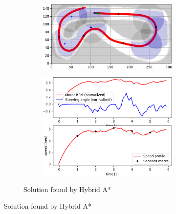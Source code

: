 \begin{figure}[!tbp]%
	\centering

	\begin{subfigure}[t]{\textwidth}
		\begin{subfigure}[c]{0.59\textwidth}
			\includegraphics[width=\textwidth]{../img/experiments/porto-hybrid_astar-trajectory}
		\end{subfigure}
		\hfill
		\begin{subfigure}[c]{0.4\textwidth}
			\includegraphics[width=\textwidth]{../img/experiments/porto-hybrid_astar-actuators}
		\end{subfigure}
		\caption{Solution found by Hybrid A*}
		\label{fig:solution_porto-hybrid_astar}	
	\end{subfigure}
	
	\vspace{0.75cm}
	

\end{figure}

